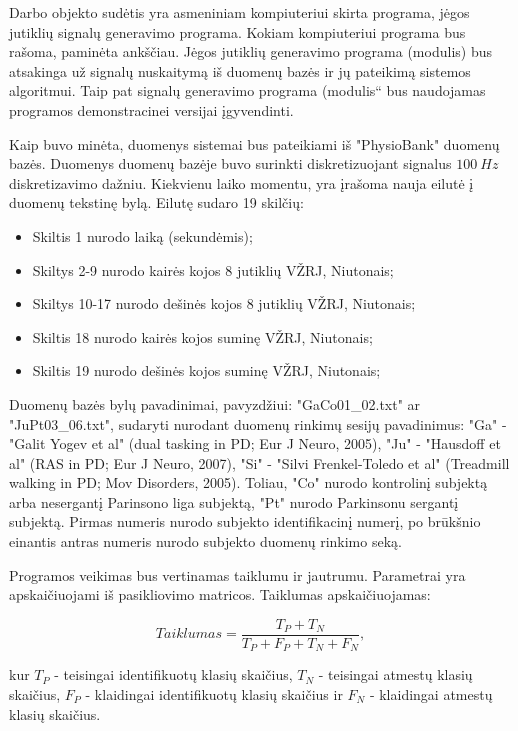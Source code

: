 \documentclass[10pt,onecolumn,draftcls]{IEEEtran}
\begin{document}
Darbo objekto sudėtis yra asmeniniam kompiuteriui skirta programa,
jėgos jutiklių signalų generavimo programa. Kokiam kompiuteriui
programa bus rašoma, paminėta ankščiau. Jėgos jutiklių generavimo
programa (modulis) bus atsakinga už signalų nuskaitymą iš duomenų
bazės ir jų pateikimą sistemos algoritmui. Taip pat signalų generavimo
programa (modulis“ bus naudojamas programos demonstracinei versijai
įgyvendinti.

Kaip buvo minėta, duomenys sistemai bus pateikiami iš "PhysioBank"
duomenų bazės. Duomenys duomenų bazėje buvo surinkti diskretizuojant
signalus $100~Hz$ diskretizavimo dažniu. Kiekvienu laiko momentu, yra
įrašoma nauja eilutė į duomenų tekstinę bylą. Eilutę sudaro 19
skilčių:

\begin{itemize}
\item Skiltis 1 nurodo laiką (sekundėmis);
\item Skiltys 2-9 nurodo kairės kojos 8 jutiklių VŽRJ, Niutonais;
\item Skiltys 10-17 nurodo dešinės kojos 8 jutiklių VŽRJ, Niutonais;
\item Skiltis 18 nurodo kairės kojos suminę VŽRJ, Niutonais;
\item Skiltis 19 nurodo dešinės kojos suminę VŽRJ, Niutonais;
\end{itemize}

Duomenų bazės bylų pavadinimai, pavyzdžiui: "GaCo01\_02.txt" ar
"JuPt03\_06.txt", sudaryti nurodant duomenų rinkimų sesijų pavadinimus:
"Ga" - "Galit Yogev et al" (dual tasking in PD; Eur J Neuro, 2005),
"Ju" - "Hausdoff et al" (RAS in PD; Eur J Neuro, 2007), "Si" - "Silvi
Frenkel-Toledo et al" (Treadmill walking in PD; Mov Disorders,
2005). Toliau, "Co" nurodo kontrolinį subjektą arba nesergantį
Parinsono liga subjektą, "Pt" nurodo Parkinsonu sergantį
subjektą. Pirmas numeris nurodo subjekto identifikacinį numerį, po
brūkšnio einantis antras numeris nurodo subjekto duomenų rinkimo seką.

Programos veikimas bus vertinamas taiklumu ir jautrumu. Parametrai yra
apskaičiuojami iš pasikliovimo matricos. Taiklumas apskaičiuojamas:

\begin{equation}
Taiklumas = \frac{T_P + T_N}{T_P + F_P + T_N + F_N},
\end{equation}

kur $T_P$ - teisingai identifikuotų klasių skaičius, $T_N$ - teisingai
atmestų klasių skaičius, $F_P$ - klaidingai identifikuotų klasių
skaičius ir $F_N$ - klaidingai atmestų klasių skaičius.
\end{document}

